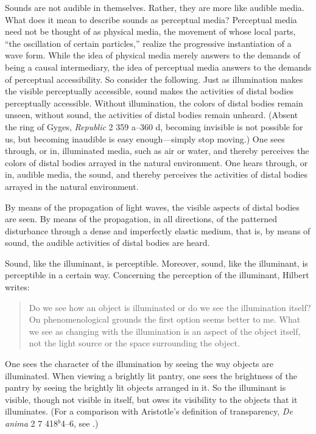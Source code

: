 Sounds are not audible in themselves. Rather, they are more like audible media. What does it mean to describe sounds as perceptual media? Perceptual media need not be thought of as physical media, the movement of whose local parts, ``the oscillation of certain particles,'' realize the progressive instantiation of a wave form. While the idea of physical media merely answers to the demands of being a causal intermediary, the idea of perceptual media answers to the demands of perceptual accessibility. So consider the following. Just as illumination makes the visible perceptually accessible, sound makes the activities of distal bodies perceptually accessible. Without illumination, the colors of distal bodies remain unseen, without sound, the activities of distal bodies remain unheard. (Absent the ring of Gyges, \emph{Republic} 2 359 a--360 d, becoming invisible is not possible for us, but becoming inaudible is easy enough---simply stop moving.) One sees through, or in, illuminated media, such as air or water, and thereby perceives the colors of distal bodies arrayed in the natural environment. One hears through, or in, audible media, the sound, and thereby perceives the activities of distal bodies arrayed in the natural environment.

By means of the propagation of light waves, the visible aspects of distal bodies are seen. By means of the propagation, in all directions, of the patterned disturbance through a dense and imperfectly elastic medium, that is, by means of sound, the audible activities of distal bodies are heard.

Sound, like the illuminant, is perceptible. Moreover, sound, like the illuminant, is perceptible in a certain way. Concerning the perception of the illuminant, Hilbert writes:
\begin{quote}
	Do we see how an object is illuminated or do we see the illumination itself? On phenomenological grounds the first option seems better to me. What we see as changing with the illumination is an aspect of the object itself, not the light source or the space surrounding the object. \citep[150--151]{Hilbert:2007qy}
\end{quote}
One sees the character of the illumination by seeing the way objects are illuminated. When viewing a brightly lit pantry, one sees the brightness of the pantry by seeing the brightly lit objects arranged in it. So the illuminant is visible, though not visible in itself, but owes its visibility to the objects that it illuminates. (For a comparison with Aristotle's definition of transparency, \emph{De anima} 2 7 418\( ^{b} \)4--6, see \citealt[41--42]{Kalderon:2015fr}.)

